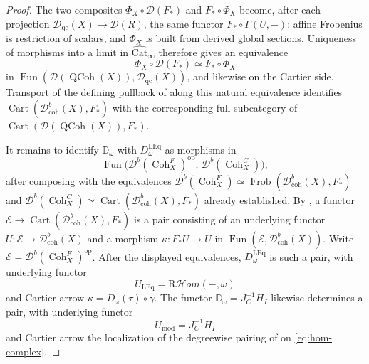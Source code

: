 \documentclass[11pt]{amsart}
\newcommand{\Cart}{\operatorname{Cart}}
\newcommand{\op}{{\operatorname{op}}}
\newcommand{\QCoh}{\operatorname{{QCoh}}}
\newcommand{\Coh}{\operatorname{{Coh}}}
\DeclareMathOperator{\Fun}{\mathrm{Fun}}
\newcommand{\Catbig}{\widehat{\mathrm{Cat}}}
\newcommand{\RHom}{\mathrm R\mathcal Hom}
\newcommand{\Frob}{\operatorname{Frob}}
\newcommand{\Dqc}{\mathcal D_{\mathrm{qc}}}
\newcommand{\Dbc}{\mathcal D^b_{\mathrm{coh}}}
\newcommand{\Db}{\mathcal D^b}
\theoremstyle{plain}
\theoremstyle{definition}
\numberwithin{equation}{section}
\begin{document}
\begin{proof}
The two composites $\Phi_X\circ\mathcal D(F_*)$ and $F_*\circ\Phi_X$ become, after each projection $\Dqc(X)\to\mathcal D(R)$, the same functor $F_*\circ\Gamma(U,-)$: affine Frobenius is restriction of scalars, and $\Phi_X$ is built from derived global sections.
Uniqueness of morphisms into a limit in $\Catbig_\infty$ therefore gives an equivalence
\[
 \Phi_X\circ\mathcal D(F_*)\simeq F_*\circ\Phi_X
\]
in $\Fun(\mathcal D(\QCoh(X)),\Dqc(X))$, and likewise on the Cartier side.
Transport of the defining pullback of  along this natural equivalence identifies $\Cart(\Dbc(X),F_*)$ with the corresponding full subcategory of $\Cart(\mathcal D(\QCoh(X)),F_*)$.

It remains to identify $\mathbb D_\omega$ with $D^{\mathrm{LEq}}_\omega$ as morphisms in
\[
 \Fun\bigl(\Db(\Coh^F_X)^{\op},\,\Db(\Coh^C_X)\bigr),
\]
after composing with the equivalences $\Db(\Coh^F_X)\simeq\Frob(\Dbc(X),F_*)$ and $\Db(\Coh^C_X)\simeq\Cart(\Dbc(X),F_*)$ already established.
By , a functor $\mathcal E\to\Cart(\Dbc(X),F_*)$ is a pair consisting of an underlying functor $U:\mathcal E\to\Dbc(X)$ and a morphism $\kappa:F_*U\to U$ in $\Fun(\mathcal E,\Dbc(X))$.
Write $\mathcal E=\Db(\Coh^F_X)^{\op}$.
After the displayed equivalences, $D^{\mathrm{LEq}}_\omega$ is such a pair, with underlying functor
\[
 U_{\mathrm{LEq}}=\RHom(-,\omega)
\]
and Cartier arrow $\kappa=D_\omega(\tau)\circ\gamma$.
The functor $\mathbb D_\omega=J_C^{-1}H_I$ likewise determines a pair, with underlying functor
\[
 U_{\mathrm{mod}}=J_C^{-1}H_I
\]
and Cartier arrow the localization of the degreewise pairing of \cite[Construction 4.1.1]{Bau} on \eqref{eq:hom-complex}.


\end{proof}
\end{document}
